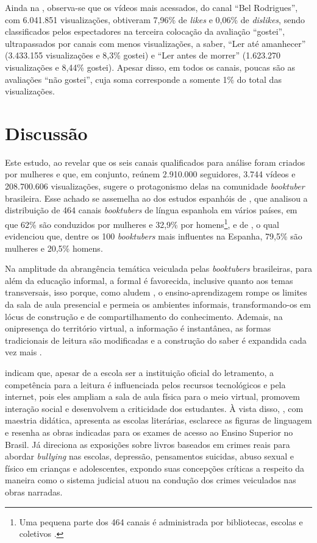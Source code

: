 \documentclass[portuguese]{textolivre}
\begin{document}
Ainda na , observa-se que os vídeos mais acessados, do
canal ``Bel Rodrigues'', com 6.041.851 visualizações, obtiveram 7,96\%
de \emph{likes} e 0,06\% de \emph{dislikes}, sendo classificados pelos
espectadores na terceira colocação da avaliação ``gostei'',
ultrapassados por canais com menos visualizações, a saber, ``Ler até
amanhecer'' (3.433.155 visualizações e 8,3\% gostei) e ``Ler antes de
morrer'' (1.623.270 visualizações e 8,44\% gostei). Apesar disso, em
todos os canais, poucas são as avaliações ``não gostei'', cuja soma
corresponde a somente 1\% do total das visualizações.

\section{Discussão}\label{sec-dis}
Este estudo, ao revelar que os seis canais qualificados para análise
foram criados por mulheres e que, em conjunto, reúnem 2.910.000
seguidores, 3.744 vídeos e 208.700.606 visualizações, sugere o
protagonismo delas na comunidade \emph{booktuber} brasileira.\textbf{
}Esse achado se assemelha ao dos estudos espanhóis de \textcite{Tomasena2021}, %
que analisou a distribuição de 464 canais \emph{booktubers} de língua
espanhola em vários países, em que 62\% são conduzidos por mulheres e
32,9\% por homens\footnote{ Uma pequena parte dos 464 canais é
  administrada por bibliotecas, escolas e coletivos \cite{Tomasena2021}. %
},
e de \textcite{GarcaRoca2020}, %
o qual evidenciou que, dentre os 100
\emph{booktubers} mais influentes na Espanha, 79,5\% são mulheres e
20,5\% homens.

Na amplitude da abrangência temática veiculada pelas \emph{booktubers}
brasileiras, para além da educação informal, a formal é favorecida,
inclusive quanto aos temas transversais, isso porque, como aludem \textcite{fialho_formacao_2021a}, o ensino-aprendizagem rompe os limites da sala de aula
presencial e permeia os ambientes informais, transformando-os em lócus
de construção e de compartilhamento do conhecimento. Ademais, na
onipresença do território virtual, a informação é instantânea, as formas
tradicionais de leitura são modificadas e a construção do saber é
expandida cada vez mais \cite{Krug2019}. %

\textcite{Ferreira2018} %
indicam que, apesar de a escola ser a
instituição oficial do letramento, a competência para a leitura é
influenciada pelos recursos tecnológicos e pela internet, pois eles
ampliam a sala de aula física para o meio virtual, promovem interação
social e desenvolvem a criticidade dos estudantes. À vista disso, \textcite{leite2021}, %
com maestria didática, apresenta as escolas literárias,
esclarece as figuras de linguagem e resenha as obras indicadas para os
exames de acesso ao Ensino Superior no Brasil. Já \textcite{rodrigues2021} %
direciona as exposições sobre livros baseados em crimes reais para
abordar \emph{bullying} nas escolas, depressão, pensamentos suicidas,
abuso sexual e físico em crianças e adolescentes, expondo suas
concepções críticas a respeito da maneira como o sistema judicial atuou
na condução dos crimes veiculados nas obras narradas.
\end{document}
